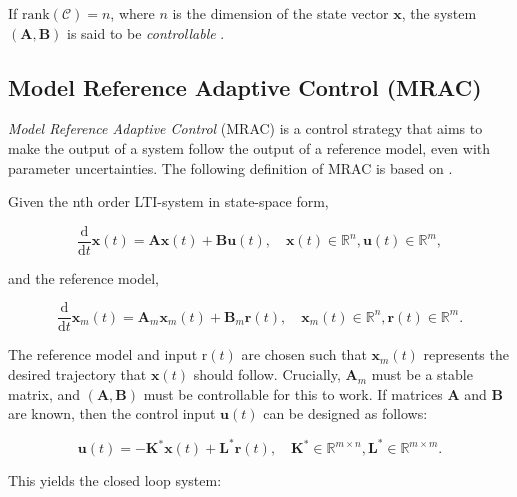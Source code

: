 If $\text{rank}(\mathcal{C}) = n$, where $n$ is the dimension of the state vector $\mathbf{x}$, the system $(\mathbf{A}, \mathbf{B})$ is said to be \textit{controllable} \parencite{balchenReguleringsteknikk2016}.

\subsection{Model Reference Adaptive Control (MRAC)}%
\label{subsec:theory_control_mrac}

\textit{Model Reference Adaptive Control} (MRAC) is a control strategy that aims to make the output of a system follow the output of a reference model, even with parameter uncertainties. The following definition of MRAC is based on \textcite[325--327]{ioannouRobustAdaptiveControl2012}. 

Given the nth order LTI-system in state-space form,

\begin{equation}
    \frac{\mathrm{d}}{\mathrm{d}t} \mathbf{x}(t) = \mathbf{A}\mathbf{x}(t) + \mathbf{B}\mathbf{u}(t), \quad \mathbf{x}(t) \in \mathbb{R}^n, \mathbf{u}(t) \in \mathbb{R}^m,
\end{equation}

and the reference model,

\begin{equation}
    \label{eq:theory_control_reference_model}
    \frac{\mathrm{d}}{\mathrm{d}t} \mathbf{x}_m(t) = \mathbf{A}_m\mathbf{x}_m(t) + \mathbf{B}_m\mathbf{r}(t), \quad \mathbf{x}_m(t) \in \mathbb{R}^n, \mathbf{r}(t) \in \mathbb{R}^m.
\end{equation}

The reference model and input $\mathrm{r}(t)$ are chosen such that $\mathbf{x}_m(t)$ represents the desired trajectory that $\mathbf{x}(t)$ should follow. Crucially, $\mathbf{A}_m$ must be a stable matrix, and $(\mathbf{A}, \mathbf{B})$ must be controllable for this to work. If matrices $\mathbf{A}$ and $\mathbf{B}$ are known, then the control input $\mathbf{u}(t)$ can be designed as follows:

\begin{equation}
    \label{eq:theory_control_ideal_mrac_input}
    \mathbf{u}(t) = -\mathbf{K^*}\mathbf{x}(t) + \mathbf{L^*}\mathbf{r}(t),
    \quad \mathbf{K^*} \in \mathbb{R}^{m \times n}, \mathbf{L^*} \in \mathbb{R}^{m \times m}.
\end{equation}

This yields the closed loop system:

